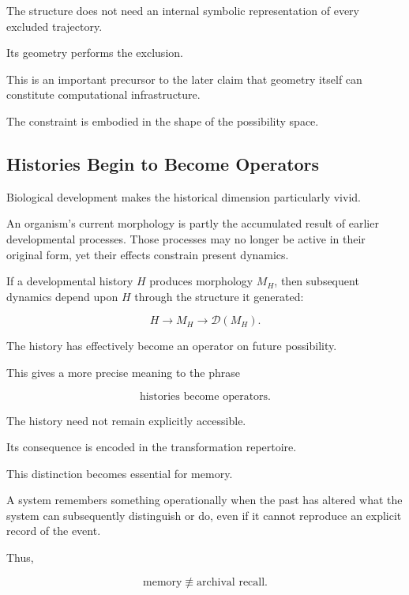 \documentclass[11pt]{article}
\theoremstyle{remark}
\begin{document}
The structure does not need an internal symbolic representation of every excluded trajectory.

Its geometry performs the exclusion.

This is an important precursor to the later claim that geometry itself can constitute computational infrastructure.

The constraint is embodied in the shape of the possibility space.

\subsection{Histories Begin to Become Operators}

Biological development makes the historical dimension particularly vivid.

An organism's current morphology is partly the accumulated result of earlier developmental processes. Those processes may no longer be active in their original form, yet their effects constrain present dynamics.

If a developmental history $H$ produces morphology $M_H$, then subsequent dynamics depend upon $H$ through the structure it generated:

\begin{equation}
H
\longrightarrow
M_H
\longrightarrow
\mathcal{D}(M_H).
\end{equation}

The history has effectively become an operator on future possibility.

This gives a more precise meaning to the phrase

\begin{equation}
\boxed{
\text{histories become operators}.
}
\end{equation}

The history need not remain explicitly accessible.

Its consequence is encoded in the transformation repertoire.

This distinction becomes essential for memory.

A system remembers something operationally when the past has altered what the system can subsequently distinguish or do, even if it cannot reproduce an explicit record of the event.

Thus,

\begin{equation}
\text{memory}
\not\equiv
\text{archival recall}.
\end{equation}
\end{document}

